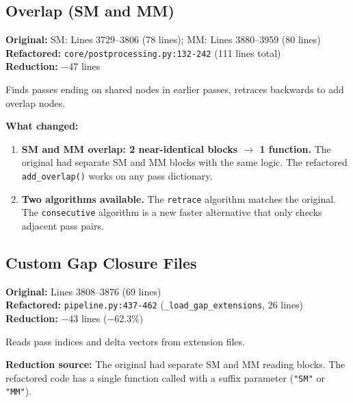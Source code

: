 \documentclass[11pt,letterpaper]{article}
\newcommand{\code}[1]{\texttt{#1}}
\begin{document}
\subsection{Overlap (SM and MM)}

\textbf{Original:} SM: Lines 3729--3806 (78 lines); MM: Lines 3880--3959 (80 lines)\\
\textbf{Refactored:} \code{core/postprocessing.py:132-242} (111 lines total)\\
\textbf{Reduction:} $-$47 lines

Finds passes ending on shared nodes in earlier passes, retraces backwards to add overlap nodes.

\textbf{What changed:}

\begin{enumerate}
    \item \textbf{SM and MM overlap: 2 near-identical blocks $\to$ 1 function.} The original had separate SM and MM blocks with the same logic. The refactored \code{add\_overlap()} works on any pass dictionary.

    \item \textbf{Two algorithms available.} The \code{retrace} algorithm matches the original. The \code{consecutive} algorithm is a new faster alternative that only checks adjacent pass pairs.
\end{enumerate}

\subsection{Custom Gap Closure Files}

\textbf{Original:} Lines 3808--3876 (69 lines)\\
\textbf{Refactored:} \code{pipeline.py:437-462} (\code{\_load\_gap\_extensions}, 26 lines)\\
\textbf{Reduction:} $-$43 lines ($-$62.3\%)

Reads pass indices and delta vectors from extension files.

\textbf{Reduction source:} The original had separate SM and MM reading blocks. The refactored code has a single function called with a suffix parameter (\code{"SM"} or \code{"MM"}).
\end{document}
